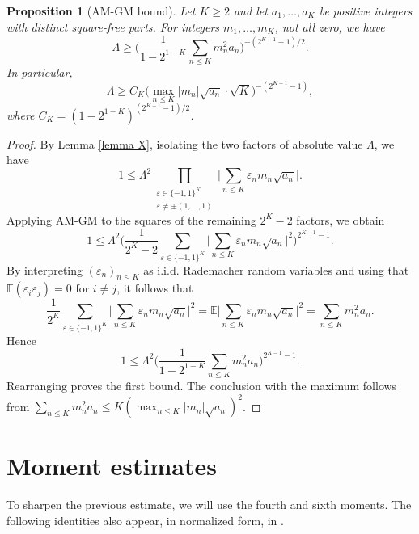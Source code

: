 \documentclass[reqno,12pt]{amsart}
\newtheorem{proposition}[theorem]{Proposition}
\theoremstyle{remark}
\newcommand{\EE}{\mathbb{E}}
\begin{document}
\begin{proposition}[AM-GM bound]\label{old thm}
Let $K\geq2$ and let $a_1,\ldots,a_K$ be positive integers with distinct square-free parts. For integers $m_1,\ldots,m_K$, not all zero, we have
$$ \Lambda\geq\bigg(\frac{1}{1-2^{1-K}}\sum_{n\leq K}m_n^2a_n\bigg)^{-(2^{K-1}-1)/2}. $$
In particular,
$$ \Lambda\geq C_K\bigg(\max_{n\leq K}|m_n|\sqrt{a_n}\cdot\sqrt K\bigg)^{-(2^{K-1}-1)}, $$
where $C_K=(1-2^{1-K})^{(2^{K-1}-1)/2}$.
\end{proposition}
\begin{proof}
By Lemma \ref{lemma X}, isolating the two factors of absolute value $\Lambda$, we have
\begin{equation}\label{equation product}
1\leq\Lambda^2\prod_{\substack{\varepsilon\in\{-1,1\}^K\\ \varepsilon\neq\pm(1,\ldots,1)}}\bigg|\sum_{n\leq K}\varepsilon_nm_n\sqrt{a_n}\bigg|.
\end{equation}
Applying AM-GM to the squares of the remaining $2^K-2$ factors, we obtain
$$ 1 \leq\Lambda^2\bigg(\frac{1}{2^K-2}\sum_{\varepsilon\in\{-1,1\}^K}\bigg|\sum_{n\leq K}\varepsilon_n m_n\sqrt{a_n}\bigg|^2\bigg)^{2^{K-1}-1}. $$
By interpreting $(\varepsilon_n)_{n\leq K}$ as i.i.d. Rademacher random variables and using that $\EE(\varepsilon_i\varepsilon_j)=0$ for $i\neq j$, it follows that
$$ \frac{1}{2^K}\sum_{\varepsilon\in\{-1,1\}^K}\bigg|\sum_{n\leq K}\varepsilon_nm_n\sqrt{a_n}\bigg|^2
=\EE\bigg|\sum_{n\leq K}\varepsilon_nm_n\sqrt{a_n}\bigg|^2
=\sum_{n\leq K}m_n^2a_n. $$
Hence
$$ 1\leq \Lambda^2\bigg(\frac{1}{1-2^{1-K}}\sum_{n\leq K}m_n^2a_n\bigg)^{2^{K-1}-1}. $$
Rearranging proves the first bound. The conclusion with the maximum follows from $\sum_{n\leq K}m_n^2a_n\leq K(\max_{n\leq K}|m_n|\sqrt{a_n})^2$.
\end{proof}

\section{Moment estimates}

To sharpen the previous estimate, we will use the fourth and sixth moments. The following identities also appear, in normalized form, in \cite[(1) and (15)]{gao_qian}.
\end{document}
